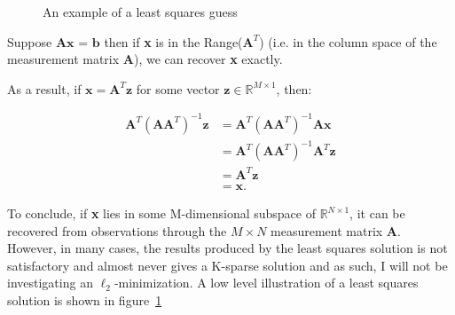 \documentclass[titlepage,oneside, 12pt]{book}
\theoremstyle{break}
\begin{document}
\begin{figure}[H]
\centering
{}
\caption{An example of a least squares guess}
\label{fig:L2Tikz}
\end{figure}

Suppose $\textbf{Ax = b}$ then if \textbf{x} is in the Range($\textbf{A}^{T}$) (i.e. in the column space of the measurement matrix \textbf{A}), we can recover \textbf{x} exactly. 

As a result, if $\textbf{x} = \textbf{A}^{T}\textbf{z}$ for some vector 
$\textbf{z} \in \mathbb{R}^{M \times 1}$, then:

\begin{align}
\textbf{A}^{T}(\textbf{A}\textbf{A}^{T})^{-1}\textbf{z} &= \textbf{A}^{T}(\textbf{A}\textbf{A}^{T})^{-1}\textbf{A}\textbf{x}
\\
&=\textbf{A}^{T}(\textbf{A}\textbf{A}^{T})^{-1}\textbf{A}^{T}\textbf{z}
\\
&=\textbf{A}^{T}\textbf{z}
\\
&= \textbf{x}. 
\end{align}
\label{eqn:l2proof}

To conclude, if \textbf{x} lies in some M-dimensional subspace of $\mathbb{R}^{N \times 1}$, it can be recovered from observations through the $M \times N$ measurement matrix \textbf{A}. However, in many cases, the results produced by the least squares solution is not satisfactory and almost never gives a K-sparse solution and as such, I will not be investigating an $\ell_{2}$-minimization. A low level illustration of a least squares solution is shown in figure~\ref{fig:L2Tikz}
\end{document}
